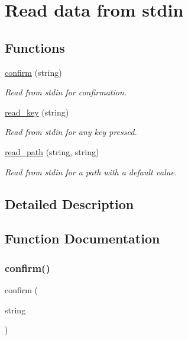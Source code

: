 \hypertarget{group__stdin}{}\section{Read data from stdin}
\label{group__stdin}
\subsection*{Functions}
\begin{DoxyCompactItemize}
\item 
\hyperlink{group__stdin_gab3340d7b2aa97133190861db32e53f7a}{confirm} (string)
\begin{DoxyCompactList}\small\item\em Read from stdin for confirmation. \end{DoxyCompactList}\item 
\hyperlink{group__stdin_ga13f97ec87f85badbce75a410d1ee9d03}{read\+\_\+key} (string)
\begin{DoxyCompactList}\small\item\em Read from stdin for any key pressed. \end{DoxyCompactList}\item 
\hyperlink{group__stdin_ga48cdd2c9387240df93e79364425097f3}{read\+\_\+path} (string, string)
\begin{DoxyCompactList}\small\item\em Read from stdin for a path with a default value. \end{DoxyCompactList}\end{DoxyCompactItemize}


\subsection{Detailed Description}


\subsection{Function Documentation}
\mbox{\label{group__stdin_gab3340d7b2aa97133190861db32e53f7a}} 
\subsubsection{\texorpdfstring{confirm()}{confirm()}}
{\footnotesize\ttfamily confirm (\begin{DoxyParamCaption}\item[{string}]{ }\end{DoxyParamCaption})}




